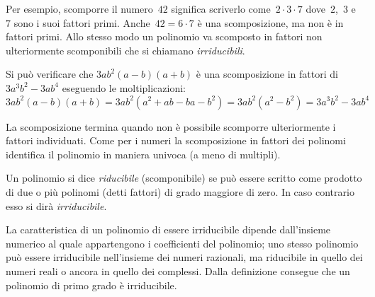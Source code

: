 \begin{minipage}{.4\textwidth}
\begin{inaccessibleblock}
 \begin{center}
% 
\scompfattnum
 \end{center}
\end{inaccessibleblock}
\end{minipage}
\begin{minipage}{.6\textwidth}
\begin{inaccessibleblock}
 \begin{center}
% 
\scompfattpol
 \end{center}
\end{inaccessibleblock}
\end{minipage}

Per esempio, scomporre il numero~\(42\) significa scriverlo 
come~\(2\cdot 3 \cdot 7\) dove~\(2\),~\(3\) e~\(7\) sono i suoi fattori primi.
Anche~\(42 = 6 \cdot 7\) è una scomposizione, ma non è in fattori primi. 
Allo stesso modo un polinomio va scomposto in fattori non ulteriormente
scomponibili che si chiamano \emph{irriducibili}. 

Si può verificare che \(3ab^{2}(a-b)(a+b)\) è una scomposizione in fattori di
\(3a^{3}b^{2}-3ab^{4}\) eseguendo le moltiplicazioni:
\[3ab^{2}(a-b)(a+b)=3ab^{2}(a^{2}+ab-ba-b^{2})=
  3ab^{2}\left(a^{2}-b^{2}\right)=3a^{3}b^{2}-3ab^{4}\]
  
La scomposizione termina quando non è possibile scomporre ulteriormente i 
fattori individuati.
Come per i numeri la scomposizione in fattori dei polinomi identifica il 
polinomio in maniera univoca (a meno di multipli).

\begin{definizione}
Un polinomio si dice \emph{riducibile} (scomponibile) se può essere scritto 
come prodotto di due o più polinomi (detti fattori) di grado maggiore di zero.
In caso contrario esso si dirà \emph{irriducibile}.
\end{definizione}

La caratteristica di un polinomio di essere irriducibile dipende dall'insieme 
numerico al quale appartengono i coefficienti del polinomio;
uno stesso polinomio può essere irriducibile nell'insieme dei numeri 
razionali, ma riducibile in quello dei numeri reali o ancora in quello dei 
complessi.
Dalla definizione consegue che un polinomio di primo grado è irriducibile.

